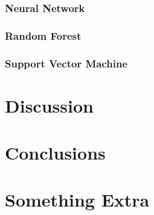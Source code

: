 \documentclass{kththesis}
\begin{document}

\subsection{Neural Network}


\subsection{Random Forest}


\subsection{Support Vector Machine}


\chapter{Discussion}
\blindtext

\chapter{Conclusions}
\blindtext

\printbibliography[heading=bibintoc]

\appendix

\chapter{Something Extra}

\tailmatter
\end{document}
